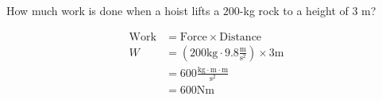 \begin{exercise}
	How much work is done when a hoist lifts a $200$-kg rock to a height of $3$ m?
\end{exercise}
\begin{solution}
	\begin{align*}
	\text{Work} &= \text{Force} \times \text{Distance}\\
	W &= \left( 200\text{kg} \cdot 9.8\frac{\text{m}}{\text{s}^2} \right) \times 3\text{m}\\
	&= 600 \frac{\text{kg}\cdot\text{m}\cdot\text{m}}{\text{s}^2}\\
	&= 600 \text{Nm}
	\end{align*}
\end{solution}

